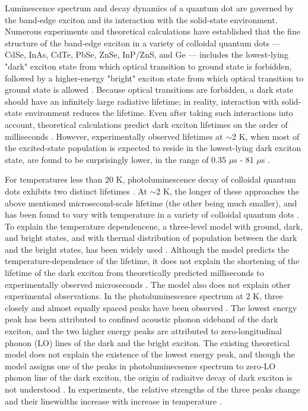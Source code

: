 \documentclass[aps,pra,preprint,groupedaddress]{revtex4-1}
\begin{document}
Luminescence spectrum and decay dynamics of a quantum dot are governed by the band-edge exciton and its interaction with the solid-state environment. Numerous experiments and theoretical calculations have established that the fine structure of the band-edge exciton in a variety of colloidal quantum dots --- CdSe, InAs, CdTe, PbSe, ZnSe, InP/ZnS, and Ge --- includes the lowest-lying "dark" exciton state from which optical transition to ground state is forbidden, followed by a higher-energy "bright" exciton state from which optical transition to ground state is allowed \cite{Nirmal1996,Efros1996,Klimov2007b,Oron2009,Eilers2014,Biadala2016,Robel2015}. Because optical transitions are forbidden, a dark state should have an infinitely large radiative lifetime; in reality, interaction with solid-state environment reduces the lifetime. Even after taking such interactions into account, theoretical calculations predict dark exciton lifetimes on the order of milliseconds \cite{Califano2005,Califano2007}. However, experimentally observed lifetimes at $\sim$2 K, when most of the excited-state population is expected to reside in the lowest-lying dark exciton state, are found to be surprisingly lower, in the range of 0.35 $\mu$s - 81 $\mu$s \cite{Crooker2003,Oron2009,Eilers2014,Biadala2016,Robel2015}. 

For temperatures less than 20 K, photoluminescence decay of colloidal quantum dots exhibits two distinct lifetimes \cite{Crooker2003, Labeau2003}. At $\sim$2 K, the longer of these approaches the above mentioned microsecond-scale lifetime (the other being much smaller), and has been found to vary with temperature in a variety of colloidal quantum dots \cite{Crooker2003, Biadala2009,Brovelli2011, Raino2011,Labeau2003, DeMelloDonega2006,Oron2009,Werschler2016}. To explain the temperature dependencene, a three-level model with ground, dark, and bright states, and with thermal distribution of population between the dark and the bright states, has been widely used \cite{Labeau2003,Crooker2003,DeMelloDonega2006,Oron2009,Biadala2009,Brovelli2011,Eilers2014,Biadala2016,Werschler2016}. Although the model predicts the temperature-dependence of the lifetime, it does not explain the shortening of the lifetime of the dark exciton from theoretically predicted milliseconds to experimentally observed microseconds \cite{Califano2005,Biadala2009}. The model also does not explain other experimental observations. In the photoluminescence spectrum at 2 K, three closely and almost equally spaced peaks have been observed \cite{Biadala2009}. The lowest energy peak has been attributed to confined acoustic phonon sideband of the dark exciton, and the two higher energy peaks are attributed to zero-longitudinal phonon (LO) lines of the dark and the bright exciton. The existing theoretical model does not explain the existence of the lowest energy peak, and though the model assigns one of the peaks in photoluminecsence spectrum to zero-LO phonon line of the dark exciton, the origin of radiaitve decay of dark exciton is not understood \cite{Biadala2009}. In experiments, the relative strengths of the three peaks change and their linewidths increase with increase in temperature \cite{Biadala2009}.
\end{document}
